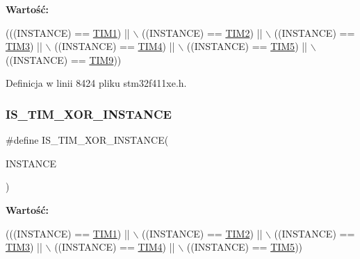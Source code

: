 {\bfseries Wartość\+:}
\begin{DoxyCode}
(((INSTANCE) == \hyperlink{group___peripheral__declaration_ga2e87451fea8dc9380056d3cfc5ed81fb}{TIM1}) || \(\backslash\)
                                         ((INSTANCE) == \hyperlink{group___peripheral__declaration_ga3cfac9f2e43673f790f8668d48b4b92b}{TIM2}) || \(\backslash\)
                                         ((INSTANCE) == \hyperlink{group___peripheral__declaration_ga61ee4c391385607d7af432b63905fcc9}{TIM3}) || \(\backslash\)
                                         ((INSTANCE) == \hyperlink{group___peripheral__declaration_ga91a09bad8bdc7a1cb3d85cf49c94c8ec}{TIM4}) || \(\backslash\)
                                         ((INSTANCE) == \hyperlink{group___peripheral__declaration_ga5125ff6a23a2ed66e2e19bd196128c14}{TIM5}) || \(\backslash\)
                                         ((INSTANCE) == \hyperlink{group___peripheral__declaration_gaf52b4b4c36110a0addfa98059f54a50e}{TIM9}))
\end{DoxyCode}


Definicja w linii 8424 pliku stm32f411xe.\+h.

\mbox{\label{group___exported__macros_ga6e06388143bb7bb111c78a3686dd753a}} 
\subsubsection{\texorpdfstring{I\+S\+\_\+\+T\+I\+M\+\_\+\+X\+O\+R\+\_\+\+I\+N\+S\+T\+A\+N\+CE}{IS\_TIM\_XOR\_INSTANCE}}
{\footnotesize\ttfamily \#define I\+S\+\_\+\+T\+I\+M\+\_\+\+X\+O\+R\+\_\+\+I\+N\+S\+T\+A\+N\+CE(\begin{DoxyParamCaption}\item[{}]{I\+N\+S\+T\+A\+N\+CE }\end{DoxyParamCaption})}

{\bfseries Wartość\+:}
\begin{DoxyCode}
(((INSTANCE) == \hyperlink{group___peripheral__declaration_ga2e87451fea8dc9380056d3cfc5ed81fb}{TIM1}) || \(\backslash\)
                                         ((INSTANCE) == \hyperlink{group___peripheral__declaration_ga3cfac9f2e43673f790f8668d48b4b92b}{TIM2}) || \(\backslash\)
                                         ((INSTANCE) == \hyperlink{group___peripheral__declaration_ga61ee4c391385607d7af432b63905fcc9}{TIM3}) || \(\backslash\)
                                         ((INSTANCE) == \hyperlink{group___peripheral__declaration_ga91a09bad8bdc7a1cb3d85cf49c94c8ec}{TIM4}) || \(\backslash\)
                                         ((INSTANCE) == \hyperlink{group___peripheral__declaration_ga5125ff6a23a2ed66e2e19bd196128c14}{TIM5}))
\end{DoxyCode}


